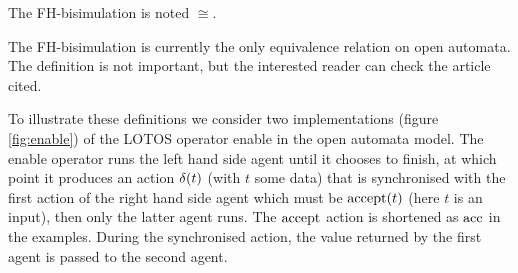 \documentclass{article}
\begin{document}
\begin{noti}[FH-bisimulation]
The FH-bisimulation \cite{henrio:01055091} is noted \(\cong\).

The FH-bisimulation is currently the only equivalence relation on open automata.
The definition is not important, but the interested reader can check the article cited.
\end{noti}
To illustrate these definitions we consider two implementations (figure \ref{fig:enable}) of the LOTOS \cite{ISOLOTOS} operator enable in the open automata model.
The enable operator runs the left hand side agent until it chooses to finish, at which point it produces an action \(\delta{\left(t\right)}\) (with \(t\) some data) that is synchronised with the first action of the right hand side agent which must be \(\mathrm{accept}{\left(t\right)}\) (here \(t\) is an input), then only the latter agent runs.
The \(\mathrm{accept}\) action is shortened as \(\mathrm{acc}\) in the examples.
During the synchronised action, the value returned by the first agent is passed to the second agent.
\end{document}
